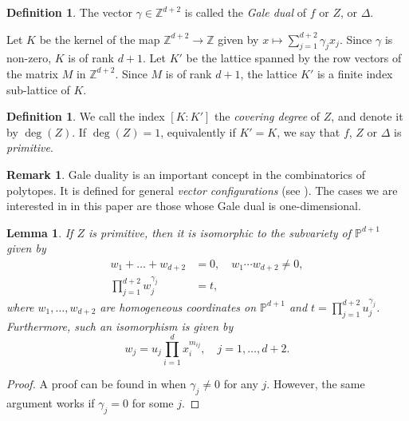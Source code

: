 \documentclass[11pt, reqno]{amsart}
\theoremstyle{plain}
\newtheorem{lem}[theo]{Lemma}
\theoremstyle{definition}
\newtheorem{defi}[theo]{Definition}
\newtheorem{rem}[theo]{Remark}
\newcommand{\Z}{\mathbb{Z}}
\newcommand{\Ps}{\mathbb{P}}
\newcommand{\ga}{\gamma}
\newcommand{\G}{\mathbb{G}}
\begin{document}
\begin{defi}\label{def:gale-dual}
The vector $\gamma \in \Z^{d+2}$ is called the \emph{Gale dual} of $f$ or $Z$, or $\Delta$. 
\end{defi}




Let $K$ be the kernel of the map $\mathbb{Z}^{d+2} \to \mathbb{Z}$ given by $x \mapsto \sum_{j=1}^{d+2} \gamma_j x_j$. Since $\ga$ is non-zero, $K$ is of rank $d+1$. Let $K'$ be the lattice spanned by the row vectors of the matrix $M$ in $\mathbb{Z}^{d+2}$. Since $M$ is of rank $d+1$, the lattice $K'$ is a finite index sub-lattice of $K$.

\begin{defi}
We call the index $[K\!:\!K']$ the \emph{covering degree} of $Z$, and denote it by $\deg(Z)$.
If $\deg(Z)=1$, equivalently if $K'=K$, we say that $f$, $Z$ or $\Delta$ is \emph{primitive}. 
\end{defi}

\begin{rem}
  Gale duality is an important concept in the combinatorics of polytopes. It is defined for general \emph{vector configurations} (see \cite[\S 4.1]{triangulations-book}).  The cases we are interested in in this paper are those whose Gale dual is one-dimensional. 
\end{rem}


\begin{lem}\label{lem:projective-to-toric}
   If $Z$ is primitive, then it is isomorphic to the subvariety of $\Ps^{d+1}$ given by 
   \begin{align*}
    w_1+\dots +w_{d+2} &=0, \quad     w_1\cdots w_{d+2} \neq 0,\\
    \prod_{j=1}^{d+2} w_j^{\gamma_j} &=t,
    \end{align*}
    where  $w_1,\dots, w_{d+2}$ are homogeneous coordinates on $\Ps^{d+1}$ and $t = \prod_{j=1}^{d+2} u_j^{\gamma_j}$. Furthermore, such an isomorphism is given by 
    \[
    w_j = u_j \prod_{i=1}^{d} x_i^{m_{ij}},  \quad j=1,\dots, {d+2} .
    \]
\end{lem}
\begin{proof}
A proof can be found in \cite[\S 3]{hypergeometric-survey} when $\ga_j \neq 0$ for any $j$. However, the same argument works if $\ga_j =0$ for some $j$.
\end{proof}
\end{document}
